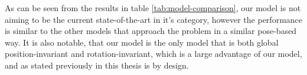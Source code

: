 As can be seen from the results in table \ref{tab:model-comparison}, our model is not aiming to be the current state-of-the-art in it's category, however the performance is similar to the other models that approach the problem in a similar pose-based way. It is also notable, that our model is the only model that is both global position-invariant and rotation-invariant, which is a large advantage of our model, and as stated previously in this thesis is by design.